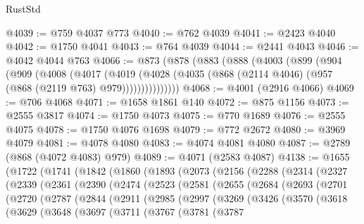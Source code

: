 \begin{lexlean}{RustStd}
\begin{coremodule}
@4039 := @759 @4037 @773
@4040 := @762 @4039
@4041 := @2423 @4040
@4042 := @1750 @4041
@4043 := @764 @4039
@4044 := @2441 @4043
@4046 := @4042 @4044 @763
@4066 := @873
    (@878
      (@883
        (@888
          (@4003
            (@899
              (@904
                (@909
                  (@4008
                    (@4017
                      (@4019
                        (@4028
                          (@4035 (@868 (@2114 @4046) (@957 (@868 (@2119 @763) @979)))))))))))))))
@4068 := @4001 (@2916 @4066)
@4069 := @706 @4068
@4071 := @1658 @1861 @140
@4072 := @875 @1156
@4073 := @2555 @3817
@4074 := @1750 @4073
@4075 := @770 @1689
@4076 := @2555 @4075
@4078 := @1750 @4076 @1698
@4079 := @772 @2672
@4080 := @3969 @4079
@4081 := @4078 @4080
@4083 := @4074 @4081 @4080
@4087 := @2789 (@868 (@4072 @4083) @979)
@4089 := @4071 (@2583 @4087)
@4138 := @1655
    (@1722
      (@1741
        (@1842
          (@1860
            (@1893
              (@2073
                (@2156
                  (@2288
                    (@2314
                      (@2327
                        (@2339
                          (@2361
                            (@2390
                              (@2474
                                (@2523
                                  (@2581
                                    (@2655
                                      (@2684
                                        (@2693
                                          (@2701
                                            (@2720
                                              (@2787
                                                (@2844
                                                  (@2911
                                                    (@2985
                                                      (@2997
                                                        (@3269
                                                          (@3426
                                                            (@3570
                                                              (@3618
                                                                (@3629
                                                                  (@3648
                                                                    (@3697
                                                                      (@3711
                                                                        (@3767
                                                                          (@3781
                                                                            (@3787

\end{coremodule}
\end{lexlean}
